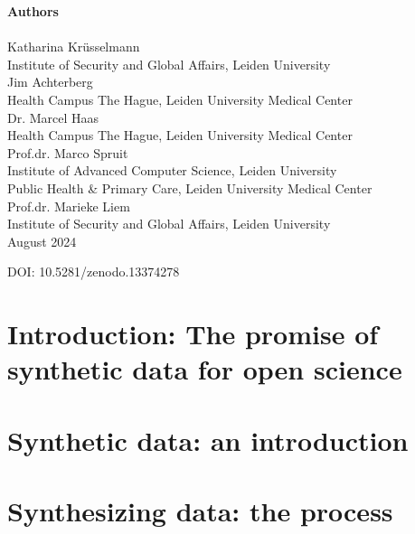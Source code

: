 \documentclass[12pt, twoside]{book}
\begin{document}
\textbf{Authors} \\\\
Katharina Krüsselmann  \\
Institute of Security and Global Affairs, Leiden University \\

Jim Achterberg   \\
Health Campus The Hague, Leiden University Medical Center \\

Dr. Marcel Haas  \\
Health Campus The Hague, Leiden University Medical Center \\

Prof.dr. Marco Spruit  \\
Institute of Advanced Computer Science, Leiden University \\
Public Health \& Primary Care, Leiden University Medical Center \\

Prof.dr. Marieke Liem  \\
Institute of Security and Global Affairs, Leiden University \\

August 2024

DOI: 10.5281/zenodo.13374278
\vspace*{\fill}

\newpage
\tableofcontents
    \thispagestyle{empty}

\cleardoublepage



\chapter{Introduction: The promise of synthetic data for open science}


\chapter{Synthetic data: an introduction}


\chapter{Synthesizing data: the process}

\end{document}
